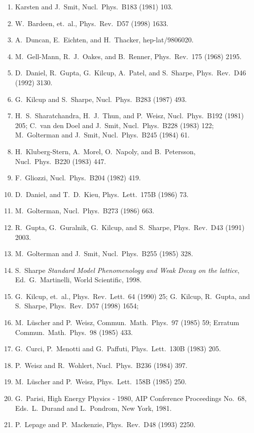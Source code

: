 \begin{enumerate}
\item Karsten and J.~Smit, Nucl.\ Phys.\ B183 (1981) 103.
\item W.~Bardeen, et.\ al., Phys.\ Rev.\ D57 (1998) 1633.
\item A.~Duncan, E.~Eichten, and H.~Thacker, hep-lat/9806020.
\item M.~Gell-Mann, R.~J.~Oakes, and B.~Renner, Phys.\ Rev.\ 175 (1968) 2195.
\item D.~Daniel, R.~Gupta, G.~Kilcup, A.~Patel, and S.~Sharpe, Phys.\ Rev.\ D46 (1992) 3130.
\item G.~Kilcup and S.~Sharpe, Nucl.\ Phys.\ B283 (1987) 493.
\item H.~S.~Sharatchandra, H.~J.~Thun, and P.~Weisz, Nucl.\ Phys.\ B192 (1981) 205; C.~van den Doel and J.~Smit, Nucl.\ Phys.\ B228 (1983) 122; M.~Golterman and J.~Smit, Nucl.\ Phys.\ B245 (1984) 61.
\item H.~Kluberg-Stern, A.~Morel, O.~Napoly, and B.~Petersson, Nucl.\ Phys.\ B220 (1983) 447.
\item F.~Gliozzi, Nucl.\ Phys.\ B204 (1982) 419.
\item D.~Daniel, and T.~D.~Kieu, Phys.\ Lett.\ 175B (1986) 73.
\item M.~Golterman, Nucl.\ Phys.\ B273 (1986) 663.
\item R.~Gupta, G.~Guralnik, G.~Kilcup, and S.~Sharpe, Phys.\ Rev.\ D43 (1991) 2003.
\item M.~Golterman and J.~Smit, Nucl.\ Phys.\ B255 (1985) 328.
\item S.~Sharpe \textit{Standard Model Phenomenology and Weak Decay on the lattice}, Ed.~G.~Martinelli, World Scientific, 1998.
\item G.~Kilcup, et.\ al., Phys.\ Rev.\ Lett.\ 64 (1990) 25; G.~Kilcup, R.~Gupta, and S.~Sharpe, Phys.\ Rev.\ D57 (1998) 1654;
\item M.~L\"uscher and P.~Weisz, Commun.\ Math.\ Phys.\ 97 (1985) 59; Erratum Commun.\ Math.\ Phys.\ 98 (1985) 433.
\item G.~Curci, P.~Menotti and G.~Paffuti, Phys.\ Lett.\ 130B (1983) 205.
\item P.~Weisz and R.~Wohlert, Nucl.\ Phys.\ B236 (1984) 397.
\item M.~L\"uscher and P.~Weisz, Phys.\ Lett.\ 158B (1985) 250.
\item G.~Parisi, High Energy Physics - 1980, AIP Conference Proceedings No.~68, Eds.~L.~Durand and L.~Pondrom, New York, 1981.
\item P.~Lepage and P.~Mackenzie, Phys.\ Rev.\ D48 (1993) 2250.

\end{enumerate}

